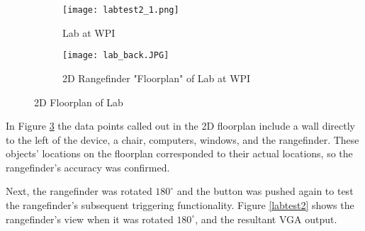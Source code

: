 

\begin{figure}[H] 
	\begin{subfigure}{1\textwidth}
	\centering
		\texttt{[image: labtest2\_1.png]}
		\caption{Lab at WPI}
		\label{lab2}
	\end{subfigure}
	\par
	\begin{subfigure}{1\textwidth}
	\centering
		\texttt{[image: lab\_back.JPG]}
		\caption{2D Rangefinder "Floorplan" of Lab at WPI}
		\label{floorplan1}
	\end{subfigure}
	\caption{2D Floorplan of Lab}
	\label{labtest1}
\end{figure}

In Figure \ref{labtest1} the data points called out in the 2D floorplan include a wall directly to the left of the device, a chair, computers, windows, and the rangefinder. These objects' locations on the floorplan corresponded to their actual locations, so the rangefinder's accuracy was confirmed.
\par
Next, the rangefinder was rotated $180^\circ$ and the button was pushed again to test the rangefinder's subsequent triggering functionality. Figure \ref{labtest2} shows the rangefinder's view when it was rotated $180^\circ$, and the resultant VGA output.

